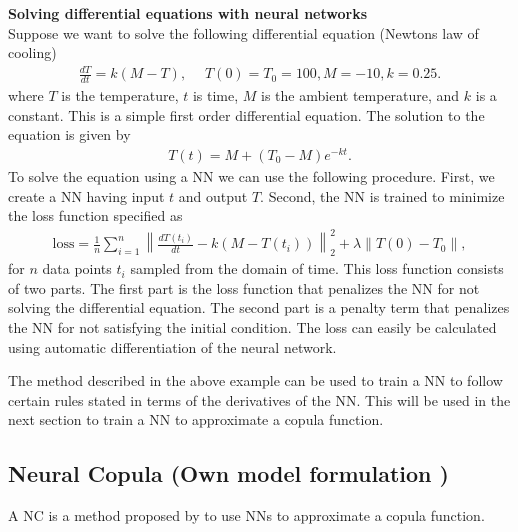\begin{example}\label{ex:NeuralNetworkDifferentialEquation}
    \textbf{Solving differential equations with neural networks}\\
    Suppose we want to solve the following differential equation (Newtons law of cooling)
    \begin{align*}
        \frac{dT}{dt} = k(M-T), \quad \; T(0) = T_0 = 100, M = -10, k = 0.25.
    \end{align*}
    where $T$ is the temperature, $t$ is time, $M$ is the ambient temperature, and $k$ is a constant. This is a simple first order differential equation. The solution to the equation is given by
    \begin{align*}
        T(t) = M + (T_0-M)e^{-kt}.
    \end{align*}
    To solve the equation using a \gls{NN} we can use the following procedure. First, we create a \gls{NN} having input $t$ and output $T$. Second, the \gls{NN} is trained to minimize the loss function specified as 
    \begin{align*}
        \mathrm{loss} = \frac{1}{n} \sum_{i=1}^{n} \left\| \frac{dT(t_i)}{dt} - k(M-T(t_i))\right\|_2^2 + \lambda \left\|T(0) - T_0\right\|,
    \end{align*}
    for $n$ data points $t_i$ sampled from the domain of time. 
    This loss function consists of two parts. The first part is the loss function that penalizes the \gls{NN} for not solving the differential equation. The second part is a penalty term that penalizes the \gls{NN} for not satisfying the initial condition. The loss can easily be calculated using automatic differentiation of the neural network. 
\end{example}
The method described in the above example can be used to train a \gls{NN} to follow certain rules stated in terms of the derivatives of the \gls{NN}. This will be used in the next section to train a \gls{NN} to approximate a copula function.  



\subsection{Neural Copula (Own model formulation )}
A \gls{NC} is a method proposed by  to use \gls{NN}s to approximate a copula function. 


